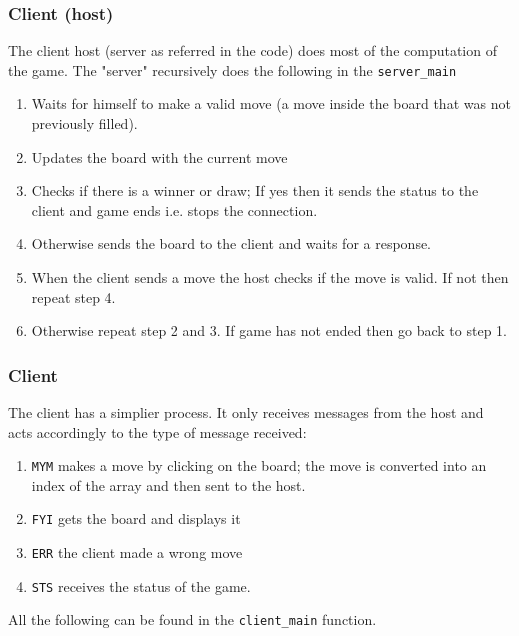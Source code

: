 \documentclass[10pt,a4paper]{article}
\begin{document}
\subsubsection{Client (host)}
The client host (server as referred in the code) does most of the computation of the game. The "server" recursively does the following in the \texttt{server\_main}
\begin{enumerate}
\item Waits for himself to make a valid move (a move inside the board that was not previously filled).
\item Updates the board with the current move
\item Checks if there is a winner or draw; If yes then it sends the status to the client and game ends i.e. stops the connection.
\item Otherwise sends the board to the client and waits for a response.
\item When the client sends a move the host checks if the move is valid. If not then repeat step 4.
\item Otherwise repeat step 2 and 3. If game has not ended then go back to step 1.
\end{enumerate}
\subsubsection{Client }
The client has a simplier process. It only receives messages from the host and acts accordingly to the type of message received:
\begin{enumerate}
\item \texttt{MYM} makes a move by clicking on the board; the move is converted into an index of the array and then sent to the host.
\item \texttt{FYI} gets the board and displays it
\item \texttt{ERR} the client made a wrong move
\item \texttt{STS} receives the status of the game.
\end{enumerate}
All the following can be found in the \texttt{client\_main} function.
\end{document}
